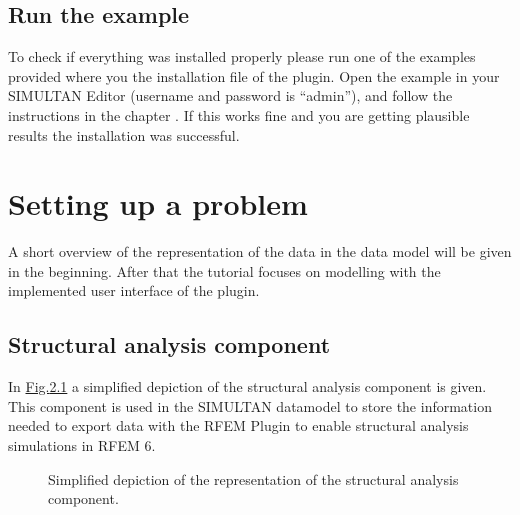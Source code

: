 \documentclass[letterpaper,10pt,english]{jupyterBook}
\let\sphinxpxdimen\pdfpxdimen\else\newdimen\sphinxpxdimen
\begin{document}
\section{Run the example}
\label{\detokenize{Getting_started_with_the_RFem_Plugin:run-the-example}}
\sphinxAtStartPar
To check if everything was installed properly please run one of the examples provided where
you  the installation file of the plugin. Open the
example in your SIMULTAN Editor (username and password is “admin”), and follow the instructions in the
chapter {\hyperref[\detokenize{Running_a_simulation:running-a-simulation}]{}}. If this works fine and you are getting plausible results the
installation was successful.

\sphinxstepscope


\chapter{Setting up a problem}
\label{\detokenize{Setting_up_a_problem:setting-up-a-problem}}\label{\detokenize{Setting_up_a_problem::doc}}
\sphinxAtStartPar
A short overview of the representation of the data in the data model will be given in the beginning. After that the
tutorial focuses on modelling with the implemented user interface of the plugin.


\section{Structural analysis component}
\label{\detokenize{Setting_up_a_problem:structural-analysis-component}}
\sphinxAtStartPar
In \hyperref[\detokenize{Setting_up_a_problem:struct-comp}]{Fig.\@ \ref{\detokenize{Setting_up_a_problem:struct-comp}}} a simplified depiction of the structural analysis component is given. This component is used in
the SIMULTAN datamodel to store the information needed to export data with the RFEM Plugin to enable structural analysis
simulations in RFEM 6.

\begin{figure}[htbp]
\centering
\capstart

\noindent\sphinxincludegraphics[height=250\sphinxpxdimen]{{struct_component}.jpg}
\caption{Simplified depiction of the representation of the structural analysis component.}\label{\detokenize{Setting_up_a_problem:struct-comp}}\end{figure}
\end{document}
